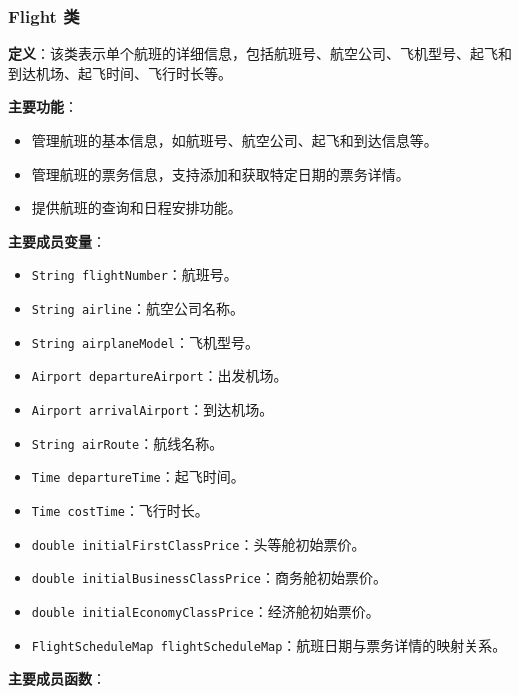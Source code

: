 \documentclass[UTF8, a4paper,12pt]{ctexart}
\begin{document}
\subsubsection{Flight 类}

\textbf{定义}：该类表示单个航班的详细信息，包括航班号、航空公司、飞机型号、起飞和到达机场、起飞时间、飞行时长等。

\textbf{主要功能}：

\begin{itemize}
    \item 管理航班的基本信息，如航班号、航空公司、起飞和到达信息等。
    \item 管理航班的票务信息，支持添加和获取特定日期的票务详情。
    \item 提供航班的查询和日程安排功能。
\end{itemize}

\textbf{主要成员变量}：

\begin{itemize}
    \item \texttt{String flightNumber}：航班号。
    \item \texttt{String airline}：航空公司名称。
    \item \texttt{String airplaneModel}：飞机型号。
    \item \texttt{Airport departureAirport}：出发机场。
    \item \texttt{Airport arrivalAirport}：到达机场。
    \item \texttt{String airRoute}：航线名称。
    \item \texttt{Time departureTime}：起飞时间。
    \item \texttt{Time costTime}：飞行时长。
    \item \texttt{double initialFirstClassPrice}：头等舱初始票价。
    \item \texttt{double initialBusinessClassPrice}：商务舱初始票价。
    \item \texttt{double initialEconomyClassPrice}：经济舱初始票价。
    \item \texttt{FlightScheduleMap flightScheduleMap}：航班日期与票务详情的映射关系。
\end{itemize}

\textbf{主要成员函数}：
\end{document}

